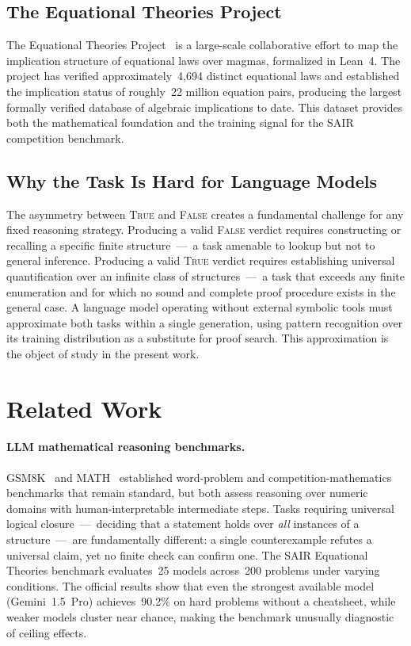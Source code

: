 \documentclass[11pt]{article}
\begin{document}
\subsection{The Equational Theories Project}

The Equational Theories Project~\citep{tao2025etp} is a large-scale
collaborative effort to map the implication structure of equational laws
over magmas, formalized in Lean~4. The project has verified
approximately~4{,}694 distinct equational laws and established the
implication status of roughly~22 million equation pairs, producing the
largest formally verified database of algebraic implications to date.
This dataset provides both the mathematical foundation and the training
signal for the SAIR competition benchmark.

\subsection{Why the Task Is Hard for Language Models}

The asymmetry between \textsc{True} and \textsc{False} creates a
fundamental challenge for any fixed reasoning strategy. Producing a
valid \textsc{False} verdict requires constructing or recalling a
specific finite structure~---~a task amenable to lookup but not to
general inference. Producing a valid \textsc{True} verdict requires
establishing universal quantification over an infinite class of
structures~---~a task that exceeds any finite enumeration and for which
no sound and complete proof procedure exists in the general case. A
language model operating without external symbolic tools must
approximate both tasks within a single generation, using pattern
recognition over its training distribution as a substitute for proof
search. This approximation is the object of study in the present work.

\section{Related Work}
\label{sec:related}

\paragraph{LLM mathematical reasoning benchmarks.}
GSM8K~\citep{cobbe2021gsm8k} and MATH~\citep{hendrycks2021math}
established word-problem and competition-mathematics benchmarks that
remain standard, but both assess reasoning over numeric domains with
human-interpretable intermediate steps. Tasks requiring universal
logical closure~---~deciding that a statement holds over \emph{all}
instances of a structure~---~are fundamentally different: a single
counterexample refutes a universal claim, yet no finite check can
confirm one. The SAIR Equational Theories benchmark evaluates~25 models
across~200 problems under varying conditions. The official results show
that even the strongest available model (Gemini~1.5~Pro) achieves~90.2\%
on hard problems without a cheatsheet, while weaker models cluster near
chance, making the benchmark unusually diagnostic of ceiling effects.
\end{document}
